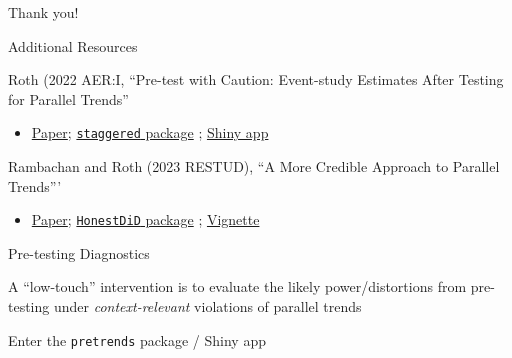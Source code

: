 \documentclass[aspectratio = 169, 13pt]{beamer}
\begin{document}
    



\appendix


\begin{frame}
	\centering
	Thank you!
\end{frame}


\begin{frame}{Additional Resources}
	\begin{wideitemize}
		\item
		Roth (2022 AER:I, ``Pre-test with Caution: Event-study Estimates After Testing for Parallel Trends''
		\begin{itemize}
			\item 
			      \href{https://jonathandroth.github.io/assets/files/roth_pretrends_testing.pdf}{Paper}; \href{https://github.com/jonathandroth/pretrends}{\texttt{staggered} package} ; \href{https://github.com/jonathandroth/PretrendsPower\#pretrendspower}{Shiny app}
		\end{itemize}
		    
		\item
		Rambachan and Roth (2023 RESTUD), ``A More Credible Approach to Parallel Trends'''
		\begin{itemize}
			\item 
			      \href{https://jonathandroth.github.io/assets/files/HonestParallelTrends_Main.pdf}{Paper}; \href{https://github.com/asheshrambachan/HonestDiD}{\texttt{HonestDiD} package} ; \href{https://github.com/asheshrambachan/HonestDiD/blob/master/doc/HonestDiD_Example.pdf}{Vignette}
		\end{itemize}
	\end{wideitemize}
\end{frame}

\begin{frame}[label = power_analysis]{Pre-testing Diagnostics}
	\begin{wideitemize}
		\item
		A ``low-touch'' intervention is to evaluate the likely power/distortions from pre-testing under \textit{context-relevant} violations of parallel trends
		
		\item Enter the \texttt{pretrends} package / Shiny app
	\end{wideitemize}
\end{frame}
\end{document}
